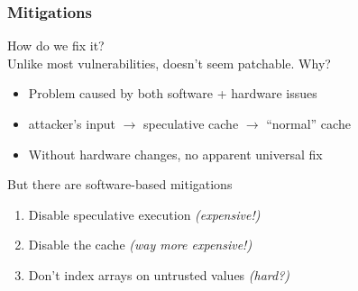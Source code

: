\documentclass[10pt]{beamer}
\begin{document}
\begin{frame}

\frametitle{Mitigations}

How do we fix it?
\\[1em]

Unlike most vulnerabilities, doesn't seem patchable. Why? \pause
\begin{itemize}
\item Problem caused by both software + hardware issues \pause
\item attacker's input $\rightarrow$ speculative cache $\rightarrow$ ``normal'' cache
\item Without hardware changes, no apparent universal fix\\[1em]
\end{itemize}

\pause
But there are software-based mitigations
\begin{enumerate}
  \pause\item Disable speculative execution \emph{(expensive!)}
  \pause\item Disable the cache \emph{(way more expensive!)}
  \pause\item Don't index arrays on untrusted values \emph{(hard?)}
\end{enumerate}

\end{frame}





\end{document}
